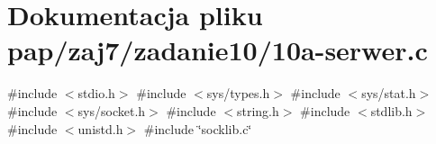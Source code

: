 \hypertarget{10a-serwer_8c}{}\section{Dokumentacja pliku pap/zaj7/zadanie10/10a-\/serwer.c}
\label{10a-serwer_8c}
{\ttfamily \#include $<$stdio.\+h$>$}\newline
{\ttfamily \#include $<$sys/types.\+h$>$}\newline
{\ttfamily \#include $<$sys/stat.\+h$>$}\newline
{\ttfamily \#include $<$sys/socket.\+h$>$}\newline
{\ttfamily \#include $<$string.\+h$>$}\newline
{\ttfamily \#include $<$stdlib.\+h$>$}\newline
{\ttfamily \#include $<$unistd.\+h$>$}\newline
{\ttfamily \#include \char`\"{}socklib.\+c\char`\"{}}\newline
